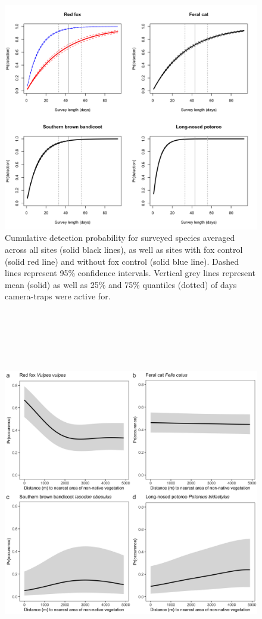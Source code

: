 \documentclass[11pt,a4paper,titlepage,twoside,openright]{style/unimelbthesis}
\begin{document}
\begin{mainmatter}
\begin{figure}
{\centering \includegraphics[width=1\linewidth]{figure/c1/detectability} 

}

\caption{Cumulative detection probability for surveyed species averaged across all sites (solid black lines), as well as sites with fox control (solid red line) and without fox control (solid blue line). Dashed lines represent 95\% confidence intervals. Vertical grey lines represent mean (solid) as well as 25\% and 75\% quantiles (dotted) of days camera-traps were active for.}\label{fig:occ-cumdet}
\end{figure}
\newpage

\(~\)

\(~\)

\(~\)
\begin{figure}

{\centering \includegraphics[width=1\linewidth]{figure/c1/dist_edge} 

}
\end{figure}
\end{mainmatter}
\end{document}
